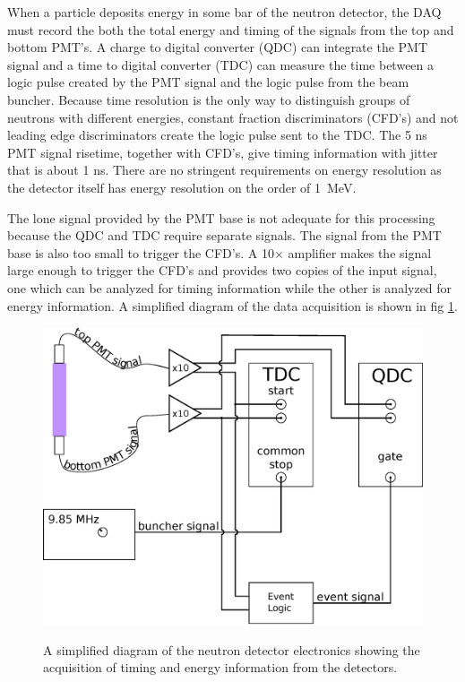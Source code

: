  When a particle deposits energy in some bar of the neutron detector, the DAQ must record the both the total energy and timing of the signals from the top and bottom PMT's.  A charge to digital converter (QDC) can integrate the PMT signal and a time to digital converter (TDC) can measure the time between a logic pulse created by the PMT signal and the logic pulse from the beam buncher.  Because time resolution is the only way to distinguish groups of neutrons with different energies, constant fraction discriminators (CFD's) and not leading edge discriminators create the logic pulse sent to the TDC.  The 5 ns PMT signal risetime, together with CFD's, give timing information with jitter that is about 1 ns.  There are no stringent requirements on energy resolution as the detector itself has energy resolution on the order of 1~MeV.

The lone signal provided by the PMT base is not adequate for this processing because the QDC and TDC require separate signals.  The signal from the PMT base is also too small to trigger the CFD's.  A 10$\times$ amplifier makes the signal large enough to trigger the CFD's and provides two copies of the input signal, one which can be analyzed for timing information while the other is analyzed for energy information.  A simplified diagram of the data acquisition is shown in fig \ref{fig:simpleElectronics}.

\begin{figure}[htp]
\centering
\includegraphics[width=1.0\textwidth]{figures/basic_electronics.eps}
\label{fig:simpleElectronics}
\caption{A simplified diagram of the neutron detector electronics showing the acquisition of timing and energy information from the detectors.}
\end{figure}

